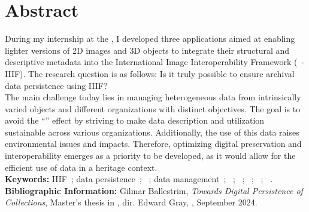 \chapter*{Abstract}
\medskip
    During my internship at the \dsc, I developed three applications aimed at enabling lighter versions of 2D images and 3D objects to integrate their structural and descriptive metadata into the International Image Interoperability Framework (\iiif~- IIIF). The research question is as follows: Is it truly possible to ensure archival data persistence using IIIF?\\
    
    The main challenge today lies in managing heterogeneous data from intrinsically varied objects and different organizations with distinct objectives. The goal is to avoid the \enquote{} effect by striving to make data description and utilization sustainable across various organizations. Additionally, the use of this data raises environmental issues and impacts. Therefore, optimizing digital preservation and interoperability emerges as a priority to be developed, as it would allow for the efficient use of data in a heritage context.\\

\textbf{Keywords:} IIIF~; data persistence~; \gco~; data management~; \py~; \html~; \css~; \JS~; \fe~.\\

\textbf{Bibliographic Information:} Gilmar Ballestrim, \textit{Towards Digital Persistence of Collections}, Master's thesis in , dir. Edward Gray, \enc, September 2024.
